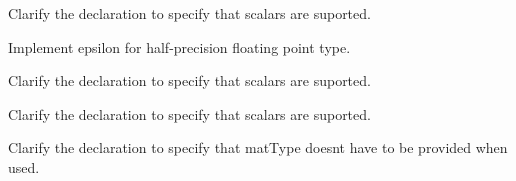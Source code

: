 
\begin{DoxyRefList}
\item[Member \mbox{\hyperlink{group__core__func__integer_gaf57da048eb6f759fc01e836de4d0ab31}{glm\+::bit\+Count}} (gen\+IUType$<$ T $>$ const \&Value)]\label{todo__todo000001}%
%
Clarify the declaration to specify that scalars are suported.  
\item[Member \mbox{\hyperlink{group__gtc__constants_gacb41049b8d22c8aa90e362b96c524feb}{glm\+::epsilon}} ()]\label{todo__todo000005}%
%
Implement epsilon for half-\/precision floating point type.  
\item[Member \mbox{\hyperlink{group__core__func__integer_gad71f97e4fdeef9a04f6f987344d119cd}{glm\+::find\+LSB}} (gen\+IUType$<$ T $>$ const \&Value)]\label{todo__todo000002}%
%
Clarify the declaration to specify that scalars are suported.  
\item[Member \mbox{\hyperlink{group__core__func__integer_gae6af6aba31eae35d23a06f40ab25fee9}{glm\+::find\+MSB}} (gen\+IUType$<$ T $>$ const \&Value)]\label{todo__todo000003}%
%
Clarify the declaration to specify that scalars are suported.  
\item[Member \mbox{\hyperlink{group__core__func__matrix_ga4008856dc87a8abcf95a90004379618e}{glm\+::outer\+Product}} (vec\+Type\+A$<$ T, P $>$ const \&c, vec\+Type\+B$<$ T, P $>$ const \&r)]\label{todo__todo000004}%
%
Clarify the declaration to specify that mat\+Type doesn\textquotesingle{}t have to be provided when used. 
\end{DoxyRefList}